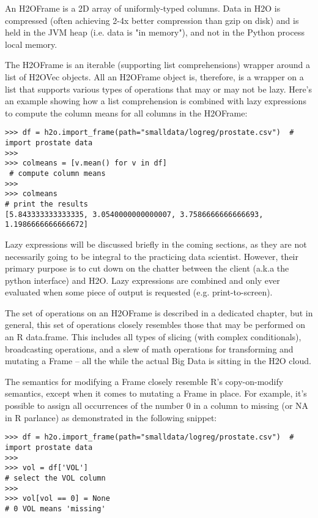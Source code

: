 An H2OFrame is a 2D array of uniformly-typed columns. Data in H2O is compressed (often achieving 2-4x better compression than gzip on disk) and is held in the JVM heap (i.e. data is "in memory"), and not in the Python process local memory. 

The H2OFrame is an iterable (supporting list comprehensions) wrapper around a list of H2OVec objects. All an H2OFrame object is, therefore, is a wrapper on a list that supports various types of operations that may or may not be lazy. Here's an example showing how a list comprehension is combined with lazy expressions to compute the column means for all columns in the H2OFrame:

\begin{lstlisting}[style=python]
>>> df = h2o.import_frame(path="smalldata/logreg/prostate.csv")  # import prostate data
>>>
>>> colmeans = [v.mean() for v in df]                           
 # compute column means
>>>
>>> colmeans                                                     
# print the results
[5.843333333333335, 3.0540000000000007, 3.7586666666666693, 1.1986666666666672]
\end{lstlisting}

Lazy expressions will be discussed briefly in the coming sections, as they are not necessarily going to be integral to the practicing data scientist. However, their primary purpose is to cut down on the chatter between the client (a.k.a the python interface) and H2O. Lazy expressions are combined and only ever evaluated when some piece of output is requested (e.g. print-to-screen).

The set of operations on an H2OFrame is described in a dedicated chapter, but in general, this set of operations closely resembles those that may be performed on an R data.frame. This includes all types of slicing (with complex conditionals), broadcasting operations, and a slew of math operations for transforming and mutating a Frame -- all the while the actual Big Data is sitting in the H2O cloud. 

The semantics for modifying a Frame closely resemble R's copy-on-modify semantics, except when it comes to mutating a Frame in place. For example, it's possible to assign all occurrences of the number 0 in a column to missing (or NA in R parlance) as demonstrated in the following snippet:

\begin{lstlisting}[style=python]
>>> df = h2o.import_frame(path="smalldata/logreg/prostate.csv")  # import prostate data
>>>
>>> vol = df['VOL']                                              
# select the VOL column
>>>
>>> vol[vol == 0] = None                                         
# 0 VOL means 'missing'
\end{lstlisting}

